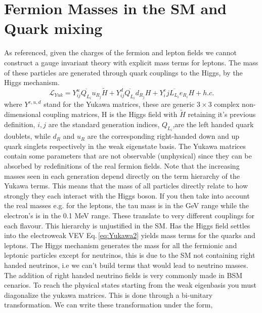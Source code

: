 \renewcommand{\cleardoublepage}{}
\renewcommand{\clearpage}{}

\section{Fermion Masses in the SM and Quark mixing}

As referenced, given the charges of the fermion and lepton fields we cannot construct a gauge invariant theory with explicit mass terms for leptons. 
%
The mass of these particles are generated through quark couplings to the Higgs, by the Higgs mechanism. 
%
\begin{equation} 
\label{eq:Yukawa2}
\mathcal{L}_{Yuk} = Y^u_{ij} \overline{Q_{L_i}} u_{R_j}  \tilde{H} + Y^d_{ij} \overline{Q_{L_i}}  d_{R_j} H  + Y^e_ij \overline{L_{L_i}}  e_{R_i} H + h.c. 
\end{equation} 
%
where $Y^{e,u,d}$ stand for the Yukawa matrices, these are generic $3\times3$ complex non-dimensional coupling matrices, H is the Higgs field with $\tilde{H}$ retaining it's previous definition, $i,j$ are the standard generation indices,{ \color{gray} $Q_{L_i}$,are the left handed quark doublets, while $d_R$ and $u_R$ are the corresponding right-handed down and up quark singlets respectively in the weak eigenstate basis. }
%
{\color{gray} The Yukawa matrices contain some parameters that are not observable (unphysical) since they can be absorbed by redefinitions of the real fermion fields. }
%
Note that the increasing masses seen in each generation depend directly on the term hierarchy of the Yukawa terms. This means that the mass of all particles directly relate to how strongly they each interact with the Higgs boson.
%
If you then take into account the real masses e.g. for the leptons, the tau mass is in the GeV range while the electron's is in the 0.1 MeV range. These translate to very different couplings for each flavour. 
%
This hierarchy is unjustified in the SM. 
%
Has the Higgs field settles into the electroweak VEV Eq.\,\ref{eq:Yukawa2} yields mass terms for the quarks and leptons. 
%
The Higgs mechanism generates the mass for all the fermionic and leptonic particles except for neutrinos, this is due to the SM not containing right handed neutrinos, i.e we can't build terms that would lead to neutrino masses.
% 
The addition of right handed neutrino fields is very commonly made in BSM cenarios. 
%
To reach the physical states starting from the weak eigenbasis you must diagonalize the yukawa matrices. This is done through a bi-unitary transformation. 
% 
We can write these transformation under the form,
